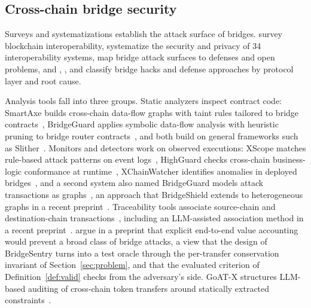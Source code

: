 \documentclass[a4paper]{cas-sc}
\begin{document}
\subsection{Cross-chain bridge security}

Surveys and systematizations establish the attack surface of bridges. \citet{belchior2021survey} survey blockchain interoperability, \citet{augusto2024sok} systematize the security and privacy of 34 interoperability systems, \citet{zhang2024bridgesok} map bridge attack surfaces to defenses and open problems, and \citet{lee2023sok}, \citet{duan2023attacks}, and \citet{li2025blockchain} classify bridge hacks and defense approaches by protocol layer and root cause.

Analysis tools fall into three groups. Static analyzers inspect contract code: SmartAxe builds cross-chain data-flow graphs with taint rules tailored to bridge contracts~\citep{liao2024smartaxe}, BridgeGuard applies symbolic data-flow analysis with heuristic pruning to bridge router contracts~\citep{zhou2025bridgeguard}, and both build on general frameworks such as Slither~\citep{feist2019slither}. Monitors and detectors work on observed executions: XScope matches rule-based attack patterns on event logs~\citep{zhang2022xscope}, HighGuard checks cross-chain business-logic conformance at runtime~\citep{eshghie2024highguard}, XChainWatcher identifies anomalies in deployed bridges~\citep{augusto2025xchainwatcher}, and a second system also named BridgeGuard models attack transactions as graphs~\citep{wu2025safeguarding}, an approach that BridgeShield extends to heterogeneous graphs in a recent preprint~\citep{lin2025bridgeshield}. Traceability tools associate source-chain and destination-chain transactions~\citep{lin2025connector, lin2025track, zheng2024xsema}, including an LLM-assisted association method in a recent preprint~\citep{liang2025connex}. \citet{liu2024montecrypto} argue in a preprint that explicit end-to-end value accounting would prevent a broad class of bridge attacks, a view that the design of BridgeSentry turns into a test oracle through the per-transfer conservation invariant of Section~\ref{sec:problem}, and that the evaluated criterion of Definition~\ref{def:valid} checks from the adversary's side. GoAT-X structures LLM-based auditing of cross-chain token transfers around statically extracted constraints~\citep{feng2026goatx}.
\end{document}
